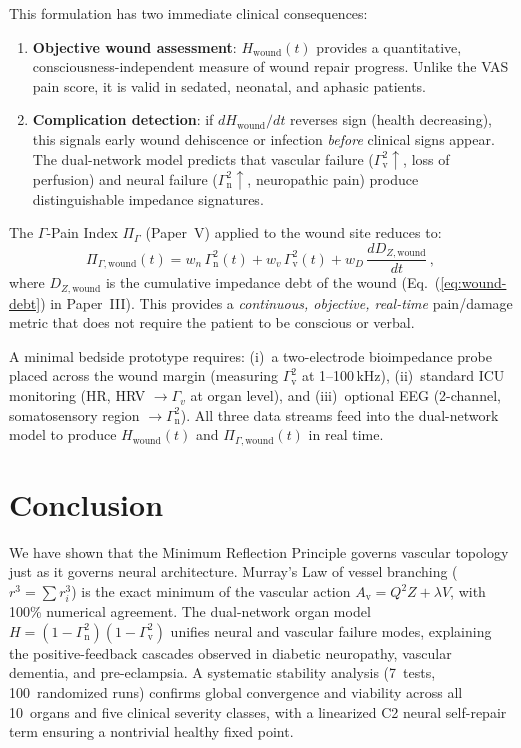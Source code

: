 ﻿\documentclass[aps,pre,twocolumn,superscriptaddress,floatfix]{revtex4-2}
\newcommand{\Gv}{\Gamma_{\mathrm{v}}}
\newcommand{\Gn}{\Gamma_{\mathrm{n}}}
\newcommand{\Av}{A_{\mathrm{v}}}
\begin{document}
This formulation has two immediate clinical consequences:
\begin{enumerate}
  \item \textbf{Objective wound assessment}:
    $H_{\text{wound}}(t)$ provides a quantitative,
    consciousness-independent measure of wound repair
    progress.
    Unlike the VAS pain score, it is valid in sedated,
    neonatal, and aphasic patients.
  \item \textbf{Complication detection}:
    if $dH_{\text{wound}}/dt$ reverses sign
    (health decreasing), this signals early wound
    dehiscence or infection \emph{before} clinical signs
    appear.
    The dual-network model predicts that vascular failure
    ($\Gv^2\uparrow$, loss of perfusion) and neural failure
    ($\Gn^2\uparrow$, neuropathic pain) produce
    distinguishable impedance signatures.
\end{enumerate}

The $\Gamma$-Pain Index $\Pi_{\Gamma}$ (Paper~V)
applied to the wound site reduces to:
\begin{equation}
  \Pi_{\Gamma,\text{wound}}(t) =
    w_n\,\Gn^2(t) + w_v\,\Gv^2(t)
    + w_D\,\frac{dD_{Z,\text{wound}}}{dt}\,,
  \label{eq:wound-pain-index}
\end{equation}
where $D_{Z,\text{wound}}$ is the cumulative impedance
debt of the wound (Eq.~(\ref{eq:wound-debt}) in Paper~III).
This provides a \emph{continuous, objective, real-time}
pain/damage metric that does not require the patient to
be conscious or verbal.

\begin{remark}
A minimal bedside prototype requires:
(i)~a two-electrode bioimpedance probe placed across the
wound margin (measuring $\Gv^2$ at 1--100\,kHz),
(ii)~standard ICU monitoring (HR, HRV $\to \Gamma_v$
at organ level), and
(iii)~optional EEG (2-channel, somatosensory region
$\to \Gn^2$).
All three data streams feed into the dual-network model
to produce $H_{\text{wound}}(t)$ and
$\Pi_{\Gamma,\text{wound}}(t)$ in real time.
\end{remark}


\section{Conclusion}\label{sec:conclusion}

We have shown that the Minimum Reflection Principle
governs vascular topology just as it governs neural
architecture.
Murray's Law of vessel branching ($r^3 = \sum r_i^3$)
is the exact minimum of the vascular action
$\Av = Q^2 Z + \lambda V$, with 100\% numerical agreement.
The dual-network organ model
$H = (1-\Gn^2)(1-\Gv^2)$ unifies neural and vascular
failure modes, explaining the positive-feedback cascades
observed in diabetic neuropathy, vascular dementia,
and pre-eclampsia.
A systematic stability analysis (7~tests, 100~randomized runs)
confirms global convergence and viability across all 10~organs
and five clinical severity classes, with a linearized C2
neural self-repair term ensuring a nontrivial healthy
fixed point.
\end{document}
